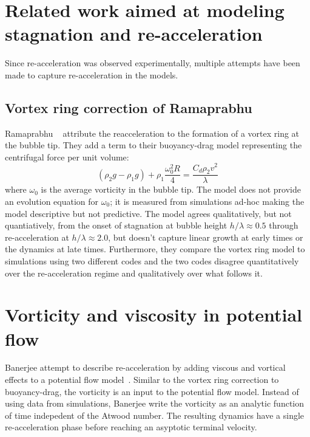 \section{Related work aimed at modeling stagnation and re-acceleration}
Since re-acceleration was observed experimentally, multiple attempts have been made to capture re-acceleration in the models.

\subsection{Vortex ring correction of Ramaprabhu}

Ramaprabhu \etal ~\cite{Ramaprabhu2012} attribute the reacceleration to the formation of a vortex ring at the bubble tip.
They add a term to their buoyancy-drag model representing the centrifugal force per unit volume:
\begin{equation}
\left(\rho_2 g - \rho_1 g\right) + \rho_1 \frac{\omega_0^2 R}{ 4} = \frac{C_d \rho_2 v^2}{\lambda}
\end{equation}
where $\omega_0$ is the average vorticity in the bubble tip.
The model does not provide an evolution equation for $\omega_0$; it is measured from simulations ad-hoc making the model descriptive but not predictive.
The model agrees qualitatively, but not quantiatively, from the onset of stagnation at bubble height $h / \lambda \approx 0.5$ through re-acceleration at $h/\lambda \approx 2.0$, but doesn't capture linear growth at early times or the dynamics at late times.
Furthermore, they compare the vortex ring model to simulations using two different codes and the two codes disagree quantitatively over the re-acceleration regime and qualitatively over what follows it.

\section{Vorticity and viscosity in potential flow}

Banerjee \etal attempt to describe re-acceleration by adding viscous and vortical effects to a potential flow model~\cite{Banerjee2011}.
Similar to the vortex ring correction to buoyancy-drag, the vorticity is an input to the potential flow model.
Instead of using data from simulations, Banerjee \etal write the vorticity as an analytic function of time indepedent of the Atwood number.
The resulting dynamics have a single re-acceleration phase before reaching an asyptotic terminal velocity.

